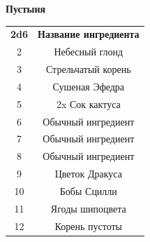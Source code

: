 \documentclass[a4paper, 9pt, twocolumn]{book}
\begin{document}
	\begin{table}[H]
		
		{\Large \textbf{Пустыня}}
		
		\medspace 
		
		\centering 
		
		\begin{tabularx}{\linewidth}{c C}
			
			\textbf{2d6} & \textbf{Название ингредиента} \\
			
			2 & Небесный глонд  \\
			
			3 & Стрельчатый корень  \\
			
			4 & Сушеная Эфедра \\
			
			5 & 2x Сок кактуса \\
			
			6 & Обычный ингредиент \\
			
			7 & Обычный ингредиент \\
			
			8 & Обычный ингредиент \\
			
			9 & Цветок Дракуса  \\
			
			10 & Бобы Сцилли  \\
			
			11 & Ягоды шипоцвета  \\
			
			12 & Корень пустоты  \\
		\end{tabularx}
	\end{table}
\end{document}
